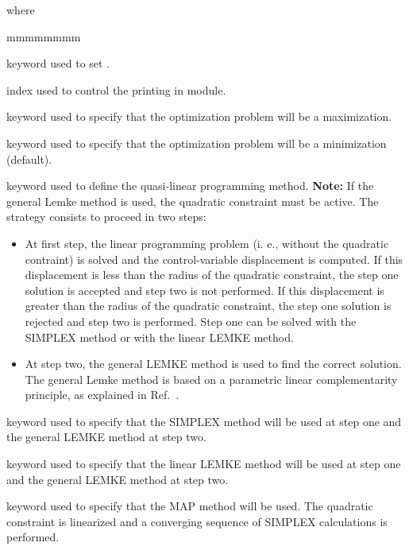 \noindent where
\begin{ListeDeDescription}{mmmmmmmm}

\item[\moc{EDIT}] keyword used to set .

\item[\dusa{iprint}] index used to control the printing in module.

\item[\moc{MAXIMIZE}] keyword used to specify that the optimization problem will be a maximization.

\item[\moc{MINIMIZE}] keyword used to specify that the optimization problem will be a minimization (default).

\item[\moc{METHOD}] keyword used to define the quasi-linear programming method. {\bf Note:} If the general Lemke method is
used, the quadratic constraint must be active. The strategy consists to proceed in two steps:
\begin{itemize}
\item At first step, the linear programming problem
(i. e., without the quadratic contraint) is solved and the control-variable displacement is computed. If this displacement is less
than the radius of the quadratic constraint, the step one solution is accepted and step two is not performed. If this displacement is greater
than the radius of the quadratic constraint, the step one solution is rejected and step two is performed. Step one can be
solved with the SIMPLEX method or with the linear LEMKE method.
\item At step two, the general LEMKE method is used to find the correct solution. The general Lemke method is based on a parametric linear
complementarity principle, as explained in Ref.~.
\end{itemize}

\item[\moc{SIMPLEX}] keyword used to specify that the SIMPLEX method will be used at step one and the general LEMKE method at step two.

\item[\moc{LEMKE}] keyword used to specify that the linear LEMKE method will be used at step one and the general LEMKE method at step two.

\item[\moc{MAP}] keyword used to specify that the MAP method will be used. The quadratic constraint is linearized and a converging sequence
of SIMPLEX calculations is performed.


\end{ListeDeDescription}
